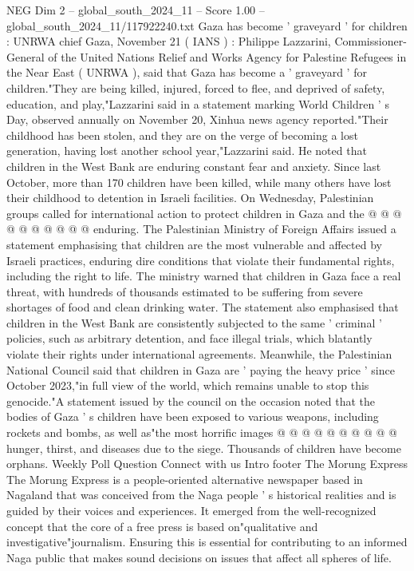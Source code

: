 \begin{textsample}{NEG Dim 2 – global\_south\_2024\_11 – Score 1.00 – global\_south\_2024\_11/117922240.txt}  \label{ex:f2_neg_271}
Gaza has become ' graveyard ' for children : UNRWA chief Gaza, November 21 ( IANS ) : Philippe Lazzarini, Commissioner-General of the United Nations Relief and Works Agency for Palestine Refugees in the Near East ( UNRWA ), said that Gaza has become a ' graveyard ' for children."They are being killed, injured, forced to flee, and deprived of safety, education, and play,"Lazzarini said in a statement marking World Children ' s Day, observed annually on November 20, Xinhua news agency reported."Their childhood has been stolen, and they are on the verge of becoming a lost generation, having lost another school year,"Lazzarini said.
He noted that children in the West Bank are enduring constant fear and anxiety.
Since last October, more than 170 children have been killed, while many others have lost their childhood to detention in Israeli facilities.
On Wednesday, Palestinian groups called for international action to protect children in Gaza and the @ @ @ @ @ @ @ @ @ @ enduring.
The Palestinian Ministry of Foreign Affairs issued a statement emphasising that children are the most vulnerable and affected by Israeli practices, enduring dire conditions that violate their fundamental rights, including the right to life.
The ministry warned that children in Gaza face a real threat, with hundreds of thousands estimated to be suffering from severe shortages of food and clean drinking water.
The statement also emphasised that children in the West Bank are consistently subjected to the same ' criminal ' policies, such as arbitrary detention, and face illegal trials, which blatantly violate their rights under international agreements.
Meanwhile, the Palestinian National Council said that children in Gaza are ' paying the heavy price ' since October 2023,"in full view of the world, which remains unable to stop this genocide."A statement issued by the council on the occasion noted that the bodies of Gaza ' s children have been exposed to various weapons, including rockets and bombs, as well as"the most horrific images @ @ @ @ @ @ @ @ @ @ hunger, thirst, and diseases due to the siege.
Thousands of children have become orphans.
Weekly Poll Question Connect with us Intro footer The Morung Express The Morung Express is a people-oriented alternative newspaper based in Nagaland that was conceived from the Naga people ' s historical realities and is guided by their voices and experiences.
It emerged from the well-recognized concept that the core of a free press is based on"qualitative and investigative"journalism.
Ensuring this is essential for contributing to an informed Naga public that makes sound decisions on issues that affect all spheres of life.

\end{textsample}
